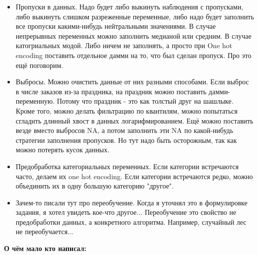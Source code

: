 \documentclass[12pt, a4paper, oneside]{article}
\begin{document}
\begin{itemize}
	\item  Пропуски в данных. Надо будет либо выкинуть наблюдения с пропусками, либо выкинуть слишком разреженные переменные, либо надо будет заполнить все пропуски какими-нибудь нейтральными значениями. В случае непрерывных переменных можно заполнить медианой или средним. В случае катогриальных модой. Либо ничем не заполнять, а просто при One hot encoding поставить отдельное дамми на то, что был сделан пропуск. Про это ещё поговорим. 
	\item Выбросы. Можно очистить данные от них разными способами. Если выброс в числе заказов из-за праздника,  на праздник можно поставить дамми-переменную. Потому что праздник - это как толстый друг на шашлыке. Кроме того, можно делать фильтрацию по квантилям, можно попытаться сгладить длинный хвост в данных логарифмированием. Ещё можно поставить везде вместо выбросов NA, а потом заполнить эти NA по какой-нибудь стратегии заполнения пропусков. Но тут надо быть осторожным, так как можно потерять кусок данных. 
	\item Предобработка категориальных переменных. Если категории встречаются часто, делаем их one hot encoding. Если категории встречаются редко, можно объединить их в одну большую категорию "другое". 
	\item Зачем-то писали тут про переобучение. Когда я уточнял это в формулировке задания, я хотел увидеть кое-что другое... Переобучение это свойство не предобработки данных, а конкретного алгоритма. Например, случайный лес не переобучается... 
\end{itemize}

\textbf{О чём мало кто написал:} 
\end{document}
